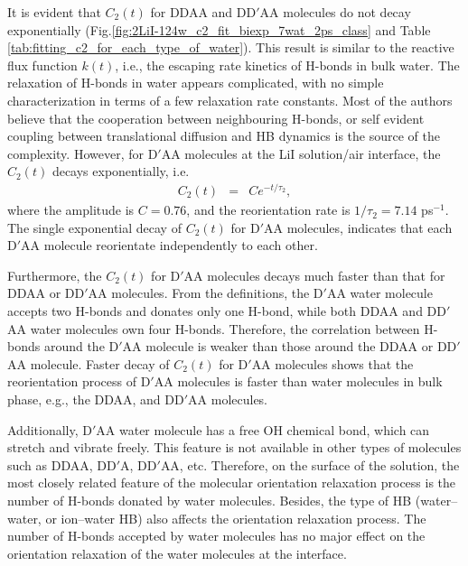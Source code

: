 It is evident that $C_2(t)$ for DDAA and DD$'$AA molecules do not decay exponentially (Fig.\thinspace\ref{fig:2LiI-124w_c2_fit_biexp_7wat_2ps_class} 
and Table \ref{tab:fitting_c2_for_each_type_of_water}).
This result is similar to the reactive flux function $k(t)$, i.e., 
the escaping rate kinetics of H-bonds in bulk water. \cite{Luzar1996} 
The relaxation of H-bonds in water appears complicated, with no simple characterization in terms of a few relaxation rate constants. 
Most of the authors believe that the cooperation between neighbouring H-bonds, \cite{Sciortino1989, Ohmine1995} or 
self evident coupling between translational diffusion and HB dynamics is the source of the complexity. \cite{Luzar1996} 
However, for D$'$AA molecules at the LiI solution/air interface,
the $C_2(t)$ decays exponentially, i.e.
\begin{eqnarray}
  C_2(t) &=& C e^{-t/{\tau_2}},\nonumber
\end{eqnarray}
where the amplitude is $C=0.76$, and the reorientation rate is $1/\tau_2 = 7.14$ ps$^{-1}$.
The single exponential decay of $C_2(t)$ for D$'$AA molecules, indicates that each D$'$AA  molecule reorientate independently to each other. 

Furthermore, the $C_2(t)$ for D$'$AA molecules decays much faster than that for DDAA or DD$'$AA molecules.
From the definitions, the D$'$AA water molecule accepts two H-bonds and donates only one H-bond, 
while both DDAA and DD$'$AA water molecules own four H-bonds.
Therefore, the correlation between H-bonds around the D$'$AA molecule is weaker than those around the DDAA or DD$'$AA molecule. 
Faster decay of $C_2(t)$ for D$'$AA molecules shows that the reorientation process of D$'$AA
molecules is faster than water molecules in bulk phase, e.g., the DDAA, and DD$'$AA molecules.

Additionally, D$'$AA water molecule has a free OH chemical bond, which can stretch and vibrate freely. 
This feature is not available in other types of molecules such as DDAA, DD$'$A, DD$'$AA, etc. 
Therefore, on the surface of the solution, the most closely related feature of the molecular orientation relaxation process is 
the number of H-bonds donated by water molecules. Besides, the type of HB (water--water, or ion--water HB) 
also affects the orientation relaxation process. The number of H-bonds accepted by water molecules has no major effect on the orientation relaxation 
of the water molecules at the interface.

